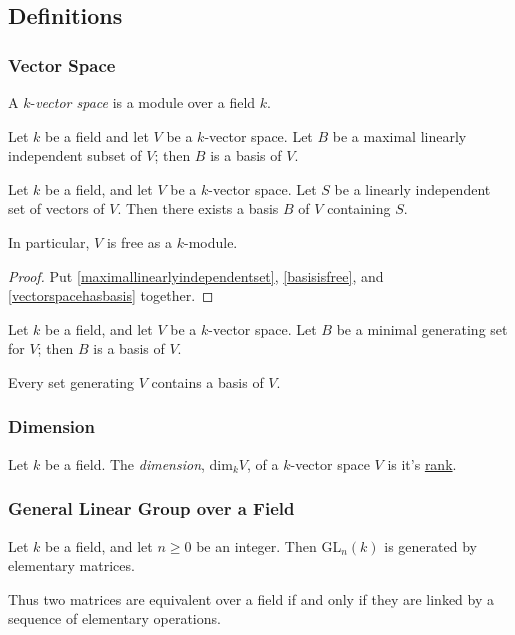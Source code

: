 \subsection{Definitions}

\subsubsection{Vector Space}\label{vectorspace}
A $k$-\emph{vector space} is a module over a field $k$.

\begin{lemma}
\label{vectorspacehasbasis}
Let $k$ be a field and let $V$ be a $k$-vector space. Let $B$ be a maximal linearly independent
subset of $V$; then $B$ is a basis of $V$.
\end{lemma}

\begin{proposition}
Let $k$ be a field, and let $V$ be a $k$-vector space. Let $S$ be a linearly independent set of vectors of $V$.
Then there exists a basis $B$ of $V$ containing $S$.

In particular, $V$ is free as a $k$-module.
\end{proposition}

\begin{proof}
Put \ref{maximallinearlyindependentset}, \ref{basisisfree}, and \ref{vectorspacehasbasis} together.
\end{proof}

\begin{lemma}
Let $k$ be a field, and let $V$ be a $k$-vector space. Let $B$ be a minimal generating set for $V$; then $B$ is a basis
of $V$.

Every set generating $V$ contains a basis of $V$.
\end{lemma}

\subsubsection{Dimension}\label{dimentions}
Let $k$ be a field. The \emph{dimension}, dim$_k V$, of a $k$-vector space $V$ is it's \hyperref[rank]{rank}.

\subsubsection{General Linear Group over a Field}

\begin{proposition}
Let $k$ be a field, and let $n \geq 0$ be an integer. Then GL$_n(k)$ is generated by elementary matrices.

Thus two matrices are equivalent over a field if and only if they are linked by a sequence of elementary operations.
\end{proposition}

